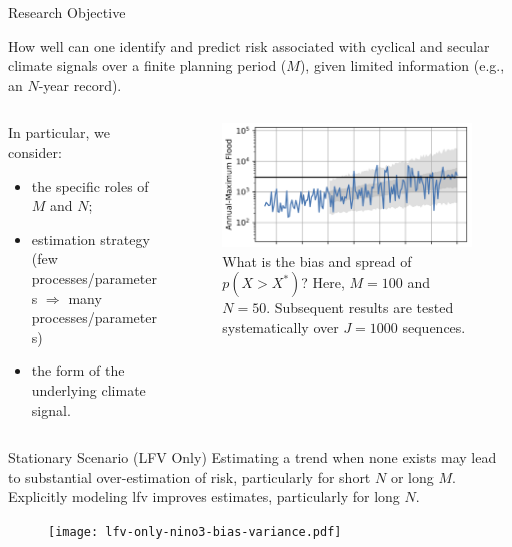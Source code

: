 \documentclass[
  10pt,     %
]{beamer}
\makeatletter
\newcommand*{\eg}{e.g.\@\xspace}
\makeatother
\begin{document}
\begin{frame}{Research Objective}
  \begin{alertblock}{How well can one identify and predict risk}
     associated with cyclical and secular climate signals over a finite planning period ($M$),  given limited information (\eg, an $N$-year record).
  \end{alertblock}
  \pause
  \begin{columns}
    \begin{column}{0.5\textwidth}
      In particular, we consider:
      \begin{itemize}
        \item the specific roles of $M$ and $N$;
        \pause
        \item estimation strategy (few processes/parameters $\Rightarrow$ many processes/parameters)
        \pause
        \item the form of the underlying climate signal.
      \end{itemize}
    \end{column}
    \pause
    \begin{column}{0.5\textwidth}
      \begin{figure}
        \includegraphics[width=\textwidth]{Example-NINO3-M100-N50-LN2.jpg}
        \caption{
          What is the bias and spread of $p(X > X^*)$?
          Here, $M=100$ and $N=50$.
          Subsequent results are tested systematically over $J=1000$ sequences.
        }
      \end{figure}
    \end{column}
  \end{columns}
\end{frame}

\begin{frame}{Stationary Scenario (LFV Only)}
  Estimating a trend when none exists may lead to substantial over-estimation of risk, particularly for short $N$ or long $M$.
  Explicitly modeling \gls{lfv} improves estimates, particularly for long $N$.
  \begin{figure}
    \centering
    \texttt{[image: lfv-only-nino3-bias-variance.pdf]}
  \end{figure}
\end{frame}
\end{document}
